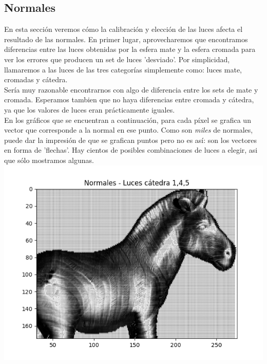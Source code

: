\subsection{Normales}

En esta sección veremos cómo la calibración y elección de las luces afecta el resultado de las normales. En primer lugar, aprovecharemos que encontramos diferencias entre las luces obtenidas por la esfera mate y la esfera cromada para ver los errores que producen un set de luces 'desviado'. Por simplicidad, llamaremos a las luces de las tres categorías simplemente como: luces mate, cromadas y cátedra. \\

Sería muy razonable encontrarnos con algo de diferencia entre los sets de mate y cromada. Esperamos tambien que no haya diferencias entre cromada y cátedra, ya que los valores de luces eran prácticamente iguales. \\

En los gráficos que se encuentran a continuación, para cada píxel se grafica un vector que corresponde a la normal en ese punto. Como son \textit{miles} de normales, puede dar la impresión de que se grafican puntos pero no es así: son los vectores en forma de 'flechas'. Hay cientos de posibles combinaciones de luces a elegir, asi que sólo mostramos algunas. \\

{\centering
    \includegraphics[scale=0.5]{informe/imagenes/normales/normalesLucesCatedra145.png}
}

